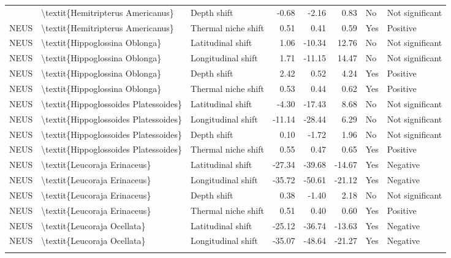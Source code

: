 \begin{longtable}[t]{lllrrrll}
{{NEUS & \textbackslash{}textit\{Hemitripterus Americanus\} & Depth shift & -0.68 & -2.16 & 0.83 & No & Not significant\\
NEUS & \textbackslash{}textit\{Hemitripterus Americanus\} & Thermal niche shift & 0.51 & 0.41 & 0.59 & Yes & Positive\\
NEUS & \textbackslash{}textit\{Hippoglossina Oblonga\} & Latitudinal shift & 1.06 & -10.34 & 12.76 & No & Not significant\\
\addlinespace
NEUS & \textbackslash{}textit\{Hippoglossina Oblonga\} & Longitudinal shift & 1.71 & -11.15 & 14.47 & No & Not significant\\
NEUS & \textbackslash{}textit\{Hippoglossina Oblonga\} & Depth shift & 2.42 & 0.52 & 4.24 & Yes & Positive\\
NEUS & \textbackslash{}textit\{Hippoglossina Oblonga\} & Thermal niche shift & 0.53 & 0.44 & 0.62 & Yes & Positive\\
NEUS & \textbackslash{}textit\{Hippoglossoides Platessoides\} & Latitudinal shift & -4.30 & -17.43 & 8.68 & No & Not significant\\
NEUS & \textbackslash{}textit\{Hippoglossoides Platessoides\} & Longitudinal shift & -11.14 & -28.44 & 6.29 & No & Not significant\\
\addlinespace
NEUS & \textbackslash{}textit\{Hippoglossoides Platessoides\} & Depth shift & 0.10 & -1.72 & 1.96 & No & Not significant\\
NEUS & \textbackslash{}textit\{Hippoglossoides Platessoides\} & Thermal niche shift & 0.55 & 0.47 & 0.65 & Yes & Positive\\
NEUS & \textbackslash{}textit\{Leucoraja Erinaceus\} & Latitudinal shift & -27.34 & -39.68 & -14.67 & Yes & Negative\\
NEUS & \textbackslash{}textit\{Leucoraja Erinaceus\} & Longitudinal shift & -35.72 & -50.61 & -21.12 & Yes & Negative\\
NEUS & \textbackslash{}textit\{Leucoraja Erinaceus\} & Depth shift & 0.38 & -1.40 & 2.18 & No & Not significant\\
\addlinespace
NEUS & \textbackslash{}textit\{Leucoraja Erinaceus\} & Thermal niche shift & 0.51 & 0.40 & 0.60 & Yes & Positive\\
NEUS & \textbackslash{}textit\{Leucoraja Ocellata\} & Latitudinal shift & -25.12 & -36.74 & -13.63 & Yes & Negative\\
NEUS & \textbackslash{}textit\{Leucoraja Ocellata\} & Longitudinal shift & -35.07 & -48.64 & -21.27 & Yes & Negative\\
}}
\end{longtable}
